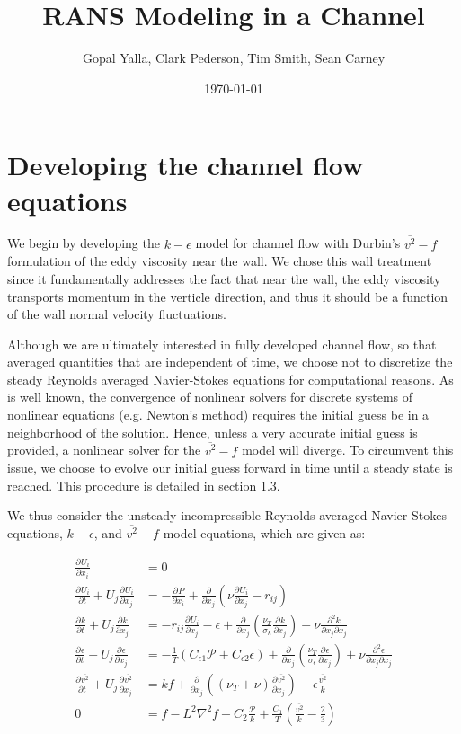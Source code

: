 \documentclass[a4paper,11pt]{article}
\title{\vspace{-4ex}RANS Modeling in a Channel}
\author{Gopal Yalla, Clark Pederson, Tim Smith, Sean Carney}
\date{\today}
\newcommand{\pderiv}[3][]{%
  \ensuremath{\frac{\partial^{#1} {#2}}{\partial {#3}^{#1}}}}
\begin{document}
\maketitle
\section{Developing the channel flow equations}

We begin by developing the $k-\epsilon$ model for channel flow with Durbin's
$\overline{v^2}-f$ formulation of the eddy viscosity near
the wall. We chose this wall treatment since it fundamentally addresses the fact that near
the wall, the eddy viscosity transports momentum in the verticle direction, and
thus it should be a function of the wall normal velocity fluctuations.

Although we are ultimately interested in fully developed channel flow, so that averaged quantities that are independent of time, we choose not to discretize the steady Reynolds averaged Navier-Stokes equations for computational reasons. As is well known, the convergence of nonlinear solvers for discrete systems of nonlinear equations (e.g. Newton's method) requires the initial guess be in a neighborhood of the solution. Hence, unless a very accurate initial guess is provided, a nonlinear solver for the $\overline{v^2}-f$ model will diverge. To circumvent this issue, we choose to evolve our initial guess forward in time until a steady state is reached. This procedure is detailed in section 1.3. 

We thus consider the unsteady incompressible Reynolds averaged Navier-Stokes equations, 
$k-\epsilon$, and $\overline{v^2}-f$ model equations, which are given as:

\begin{align}
\pderiv{U_i}{x_i} &= 0 \label{eq:continuity} \\
\pderiv{U_i}{t} + U_j\pderiv{U_i}{x_j} &= -\pderiv{P}{x_i} +
\pderiv{}{x_j}\left(\nu\pderiv{U_i}{x_j} - r_{ij}\right) \\
\pderiv{k}{t} + U_j\pderiv{k}{x_j} &= -r_{ij}\pderiv{U_i}{x_j} - \epsilon +
\pderiv{}{x_j}\left(\frac{\nu_T}{\sigma_k}\pderiv{k}{x_j}\right) +
\nu\frac{\partial^2 k}{\partial x_j \partial x_j} \\
\pderiv{\epsilon}{t} + U_j\pderiv{\epsilon}{x_j} &=
-\frac{1}{T}\left(C_{\epsilon 1} \mathcal{P} + C_{\epsilon 2} \epsilon\right) +
\pderiv{}{x_j}\left(\frac{\nu_T}{\sigma_\epsilon}\pderiv{\epsilon}{x_j}\right) +
\nu\frac{\partial^2 \epsilon}{\partial x_j \partial x_j} \\
\pderiv{\overline{v^2}}{t} + U_j\pderiv{\overline{v^2}}{x_j} &= kf +
\pderiv{}{x_j}\left((\nu_T+\nu)\pderiv{\overline{v^2}}{x_j}\right) - \epsilon
\frac{\overline{v^2}}{k} \\
0 &=  f -  L^2 \nabla^2 f  -C_2 \frac{\mathcal{P}}{k} + \frac{C_1}{T} \left(
\frac{\overline{v^2}}{k} - \frac{2}{3} \right) 
\label{eq:redistribution}
\end{align}
\end{document}
